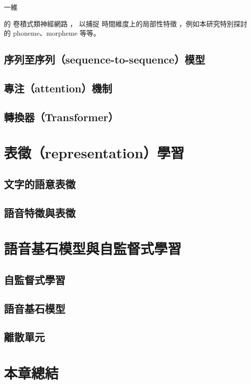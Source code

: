 一維

的
卷積式類神經網路
，
以捕捉
時間維度上的局部性特徵
，例如本研究特別探討的 phoneme、morpheme 等等。




\subsection{
    序列至序列（sequence-to-sequence）模型}

    


\subsection{專注（attention）機制}    

\subsection{轉換器（Transformer）}



\section{表徵（representation）學習}


\subsection{文字的語意表徵}

\subsection{語音特徵與表徵}

\section{語音基石模型與自監督式學習}

\subsection{自監督式學習}

\subsection{語音基石模型}

\subsection{離散單元}

\section{本章總結}

